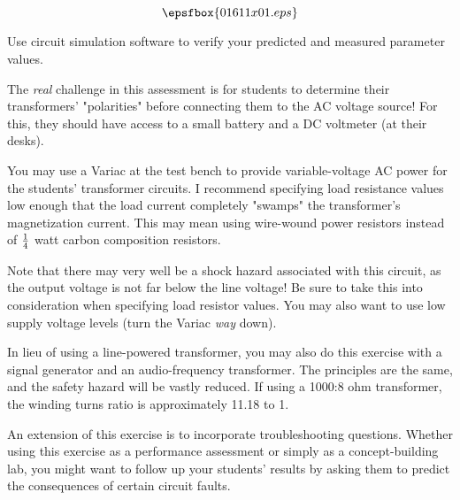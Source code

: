 

$$\epsfbox{01611x01.eps}$$

\vfil \eject






Use circuit simulation software to verify your predicted and measured parameter values.







The {\it real} challenge in this assessment is for students to determine their transformers' "polarities" before connecting them to the AC voltage source!  For this, they should have access to a small battery and a DC voltmeter (at their desks).

You may use a Variac at the test bench to provide variable-voltage AC power for the students' transformer circuits.  I recommend specifying load resistance values low enough that the load current completely "swamps" the transformer's magnetization current.  This may mean using wire-wound power resistors instead of $1 \over 4$ watt carbon composition resistors.

Note that there may very well be a shock hazard associated with this circuit, as the output voltage is not far below the line voltage!  Be sure to take this into consideration when specifying load resistor values.  You may also want to use low supply voltage levels (turn the Variac {\it way} down).

In lieu of using a line-powered transformer, you may also do this exercise with a signal generator and an audio-frequency transformer.  The principles are the same, and the safety hazard will be vastly reduced.  If using a 1000:8 ohm transformer, the winding turns ratio is approximately 11.18 to 1.

An extension of this exercise is to incorporate troubleshooting questions.  Whether using this exercise as a performance assessment or simply as a concept-building lab, you might want to follow up your students' results by asking them to predict the consequences of certain circuit faults.





